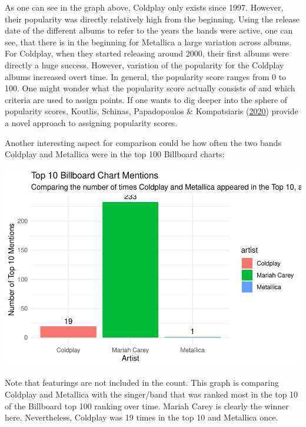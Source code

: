\documentclass[11pt,preprint, authoryear]{elsarticle}
\let\origfigure\figure
\let\endorigfigure\endfigure
\renewenvironment{figure}[1][2] {
    \expandafter\origfigure\expandafter[H]
} {
    \endorigfigure
}
\numberwithin{equation}{section}
\numberwithin{figure}{section}
\numberwithin{table}{section}
\begin{document}
As one can see in the graph above, Coldplay only exists since 1997.
However, their popularity was directly relatively high from the
beginning. Using the release date of the different albums to refer to
the years the bands were active, one can see, that there is in the
beginning for Metallica a large variation across albums. For Coldplay,
when they started releasing around 2000, their first albums were
directly a huge success. However, variation of the popularity for the
Coldplay albums increased overt time. In general, the popularity score
ranges from 0 to 100. One might wonder what the popularity score
actually consists of and which criteria are used to assign points. If
one wants to dig deeper into the sphere of popularity scores, Koutlis,
Schinas, Papadopoulos \& Kompatsiaris
(\protect\hyperlink{ref-info11060323}{2020}) provide a novel approach to
assigning popularity scores.

Another interesting aspect for comparison could be how often the two
bands Coldplay and Metallica were in the top 100 Billboard charts:

\begin{figure}[H]

{\centering \includegraphics{Question2_files/figure-latex/Figure4-1} 

}

\caption{Amount of top 10 in Billboard 100 (no features) \label{Figure4}}\label{fig:Figure4}
\end{figure}

Note that featurings are not included in the count. This graph is
comparing Coldplay and Metallica with the singer/band that was ranked
most in the top 10 of the Billboard top 100 ranking over time. Mariah
Carey is clearly the winner here. Nevertheless, Coldplay was 19 times in
the top 10 and Metallica once.
\end{document}
